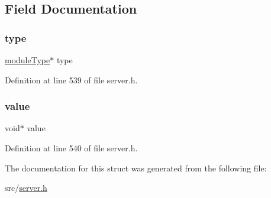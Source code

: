 \subsection{Field Documentation}
\mbox{\label{structmodule_value_a05eee39e39e34439ea77af35b597b1ae}} 
\subsubsection{\texorpdfstring{type}{type}}
{\footnotesize\ttfamily \hyperlink{server_8h_a3e81a33920e783a6b35dedfd7bdb6a2c}{module\+Type}$\ast$ type}



Definition at line 539 of file server.\+h.

\mbox{\label{structmodule_value_a0f61d63b009d0880a89c843bd50d8d76}} 
\subsubsection{\texorpdfstring{value}{value}}
{\footnotesize\ttfamily void$\ast$ value}



Definition at line 540 of file server.\+h.



The documentation for this struct was generated from the following file\+:\begin{DoxyCompactItemize}
\item 
src/\hyperlink{server_8h}{server.\+h}\end{DoxyCompactItemize}
